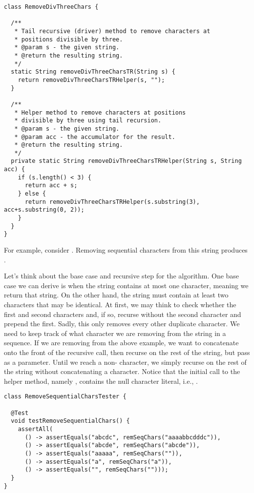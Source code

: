 \begin{lstlisting}[language=MyJava]
class RemoveDivThreeChars {

  /**
   * Tail recursive (driver) method to remove characters at 
   * positions divisible by three.
   * @param s - the given string.
   * @return the resulting string.
   */
  static String removeDivThreeCharsTR(String s) {
    return removeDivThreeCharsTRHelper(s, "");
  }

  /**
   * Helper method to remove characters at positions 
   * divisible by three using tail recursion.
   * @param s - the given string.
   * @param acc - the accumulator for the result.
   * @return the resulting string.
   */
  private static String removeDivThreeCharsTRHelper(String s, String acc) {
    if (s.length() < 3) {
      return acc + s;
    } else {
      return removeDivThreeCharsTRHelper(s.substring(3), acc+s.substring(0, 2));
    }
  }
}
\end{lstlisting}

For example, consider .
Removing sequential characters from this string produces .

Let's think about the base case and recursive step for the algorithm.
One base case we can derive is when the string contains at most one character, meaning we return that string.
On the other hand, the string must contain at least two characters that may be identical. 
At first, we may think to check whether the first and second characters and, if so, recurse without the second character and prepend the first. 
Sadly, this only removes every other duplicate character.
We need to keep track of what character we are removing from the string in a sequence.
If we are removing  from the above example, we want to concatenate  onto the front of the recursive call, then recurse on the rest of the string, but pass  as a parameter.
Until we reach a non- character, we simply recurse on the rest of the string without concatenating a character.
Notice that the initial call to the helper method, namely , contains the null character literal, i.e., \ttt{\q{}\textbackslash{}0\q{}}. 

\enlargethispage{3\baselineskip}
\begin{lstlisting}[language=MyJava]
class RemoveSequentialCharsTester {

  @Test
  void testRemoveSequentialChars() {
    assertAll(
      () -> assertEquals("abcdc", remSeqChars("aaaabbcdddc")),
      () -> assertEquals("abcde", remSeqChars("abcde")),
      () -> assertEquals("aaaaa", remSeqChars("")),
      () -> assertEquals("a", remSeqChars("a")),
      () -> assertEquals("", remSeqChars("")));
  }
}
\end{lstlisting}

